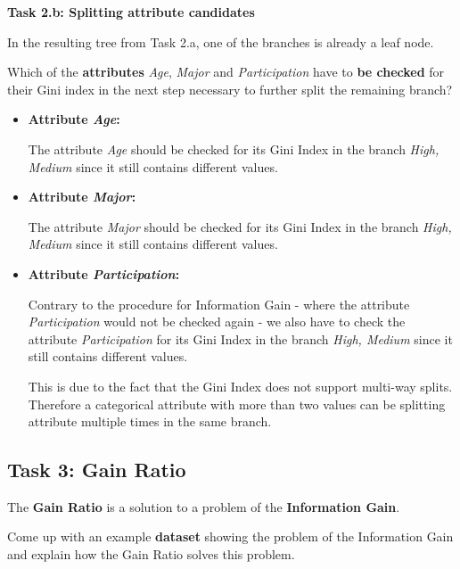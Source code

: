 \documentclass[
english,
smallborders
]{i6prcsht}
\begin{document}
\textbf{Task 2.b: Splitting attribute candidates}

In the resulting tree from Task 2.a, one of the branches is already a leaf node.

Which of the \textbf{attributes} \textit{Age}, \textit{Major} and \textit{Participation} have to \textbf{be checked} for their Gini index in the next step necessary to further split the remaining branch?

\begin{solution}
	\begin{itemize}
		\item \textbf{Attribute \textit{Age}:}

		      The attribute \textit{Age} should be checked for its Gini Index in the branch \textit{High, Medium} since it still contains different values.

		\item \textbf{Attribute \textit{Major}:}

		      The attribute \textit{Major} should be checked for its Gini Index in the branch \textit{High, Medium} since it still contains different values.

		\item \textbf{Attribute \textit{Participation}:}

		      Contrary to the procedure for Information Gain - where the attribute \textit{Participation} would not be checked again - we also have to check the attribute \textit{Participation} for its Gini Index in the branch \textit{High, Medium} since it still contains different values.

		      This is due to the fact that the Gini Index does not support multi-way splits. Therefore a categorical attribute with more than two values can be splitting attribute multiple times in the same branch.


	\end{itemize}
\end{solution}

\subsection*{Task 3: Gain Ratio}

The \textbf{Gain Ratio} is a solution to a problem of the \textbf{Information Gain}.

Come up with an example \textbf{dataset} showing the problem of the Information Gain and explain how the Gain Ratio solves this problem.
\end{document}
